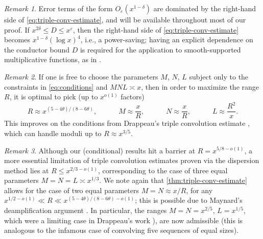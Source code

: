 \documentclass[reqno,11pt]{amsart}
\theoremstyle{definition}
\theoremstyle{remark}
\newtheorem*{remark}{Remark}
\numberwithin{equation}{section}
\newcommand{\eps}{\varepsilon}
\newcommand{\fix}[1]{\textcolor{myBlue}{\large (#1)\normalsize}}
\begin{document}

\begin{remark}
Error terms of the form $O_\eps(x^{1-\delta})$ are dominated by the right-hand side of \cref{eq:triple-conv-estimate}, and will be available throughout most of our proof. If $x^{2\delta} \le D \le x^\eps$, then the right-hand side of \cref{eq:triple-conv-estimate} becomes $x^{1-\delta} (\log x)^4$, i.e., a power-saving; having an explicit dependence on the conductor bound $D$ is required for the application to smooth-supported multiplicative functions, as in \cite{drappeau2017smooth}.
\end{remark}

\begin{remark}
If one is free to choose the parameters $M$, $N$, $L$ subject only to the constraints in \cref{eq:conditions} and $MNL \asymp x$, then in order to maximize the range $R$, it is optimal to pick (up to $x^{o(1)}$ factors)
\begin{equation} \label{eq:optimal-parameters}
    R \approx x^{(5-4\theta)/(8-6\theta)},
    \qquad\quad
    M \approx \frac{x}{R},
    \qquad\quad 
    N \approx \frac{x}{R},
    \qquad\quad
    L \approx \frac{R^2}{x}.
\end{equation}
This improves on the conditions from Drappeau's triple convolution estimate \cite[(3.2)]{drappeau2015theoremes}, which can handle moduli up to $R \approx x^{3/5}$. %
\end{remark}

\begin{remark}
Although our (conditional) results hit a barrier at $R = x^{5/8-o(1)}$, a more essential limitation of triple convolution estimates proven via the dispersion method lies at $R \le x^{2/3 - o(1)}$, corresponding to the case of three equal parameters $M = N = L \asymp x^{1/3}$. We note again that \cref{thm:triple-conv-estimate} allows for the case of two equal parameters $M = N \approx x/R$, for any $x^{1/2-o(1)} \ll R \ll x^{(5-4\theta)/(8-6\theta)-o(1)}$; this is possible due to Maynard's deamplification argument \cite{maynard2020primes}. In particular, the ranges $M = N = x^{2/5}$, $L = x^{1/5}$, which were a limiting case in Drappeau's work \cite[Th\'eor\`eme 3]{drappeau2015theoremes}), are now admissible (this is analogous to the infamous case of convolving five sequences of equal sizes).
\end{remark}
\end{document}
